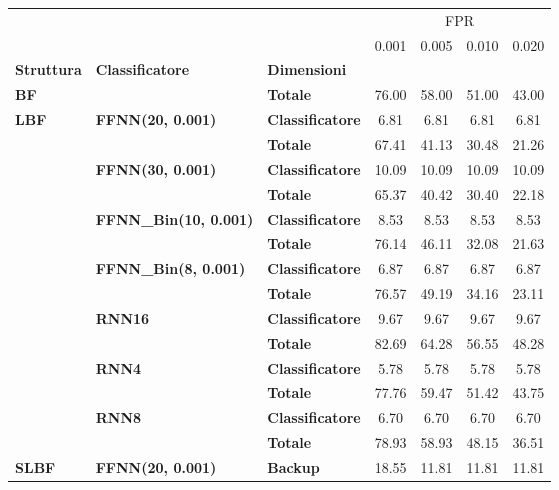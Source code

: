 \begin{table}[H]
\centering
\begin{tabular}{|l|l|l|c|c|c|c|}
\hline
     &      &        & \multicolumn{4}{|c|}{FPR} \\
     &      &        & 0.001 & 0.005 & 0.010 & 0.020 \\
\textbf{Struttura} & \textbf{Classificatore} & \textbf{Dimensioni} &       &       &       &       \\
\hline
\textbf{BF} &      & \textbf{Totale} & 76.00 & 58.00 & 51.00 & 43.00 \\
\multirow{14}{*}{\textbf{LBF}} & \multirow{2}{*}{\textbf{FFNN(20, 0.001)}} & \textbf{Classificatore} &  6.81 &  6.81 &  6.81 &  6.81 \\
     &      & \textbf{Totale} & 67.41 & 41.13 & 30.48 & 21.26 \\
\cline{2-7}
     & \multirow{2}{*}{\textbf{FFNN(30, 0.001)}} & \textbf{Classificatore} & 10.09 & 10.09 & 10.09 & 10.09 \\
     &      & \textbf{Totale} & 65.37 & 40.42 & 30.40 & 22.18 \\
\cline{2-7}
     & \multirow{2}{*}{\textbf{FFNN\_Bin(10, 0.001)}} & \textbf{Classificatore} &  8.53 &  8.53 &  8.53 &  8.53 \\
     &      & \textbf{Totale} & 76.14 & 46.11 & 32.08 & 21.63 \\
\cline{2-7}
     & \multirow{2}{*}{\textbf{FFNN\_Bin(8, 0.001)}} & \textbf{Classificatore} &  6.87 &  6.87 &  6.87 &  6.87 \\
     &      & \textbf{Totale} & 76.57 & 49.19 & 34.16 & 23.11 \\
\cline{2-7}
     & \multirow{2}{*}{\textbf{RNN16}} & \textbf{Classificatore} &  9.67 &  9.67 &  9.67 &  9.67 \\
     &      & \textbf{Totale} & 82.69 & 64.28 & 56.55 & 48.28 \\
\cline{2-7}
     & \multirow{2}{*}{\textbf{RNN4}} & \textbf{Classificatore} &  5.78 &  5.78 &  5.78 &  5.78 \\
     &      & \textbf{Totale} & 77.76 & 59.47 & 51.42 & 43.75 \\
\cline{2-7}
     & \multirow{2}{*}{\textbf{RNN8}} & \textbf{Classificatore} &  6.70 &  6.70 &  6.70 &  6.70 \\
     &      & \textbf{Totale} & 78.93 & 58.93 & 48.15 & 36.51 \\
\cline{1-7}
\cline{2-7}
\multirow{28}{*}{\textbf{SLBF}} & \multirow{4}{*}{\textbf{FFNN(20, 0.001)}} & \textbf{Backup} & 18.55 & 11.81 & 11.81 & 11.81 \\

\end{tabular}
\end{table}
